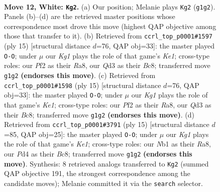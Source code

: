 \documentclass[11pt]{article}
\begin{document}
\clearpage

\begin{figure}[p]\centering
\begin{subfigure}{0.46\textwidth}\centering
\resizebox{\linewidth}{!}{%
\newchessgame
\chessboard[
  setfen={rnbqr1k1/p3bppp/2p1p3/1p1n4/3P4/3Q1BP1/PP1NPP1P/RNB2RK1 w - - 0 12},
  showmover=false,
  pgfstyle=straightmove, color=movearrow, markmove={g1-g2}
]}
\caption{}
\end{subfigure}\hfill
\begin{subfigure}{0.46\textwidth}\centering
\resizebox{\linewidth}{!}{%
\newchessgame
\chessboard[
  setfen={r1bqk2r/ppp1npbp/2np2p1/8/2PNP3/2N1B1P1/PP3P1P/R2QKB1R b KQkq - 2 8},
  showmover=false,
  pgfstyle=straightmove, color=movearrow, markmove={e8-g8}
]}
\caption{}
\end{subfigure}
\\[4pt]
\begin{subfigure}{0.46\textwidth}\centering
\resizebox{\linewidth}{!}{%
\newchessgame
\chessboard[
  setfen={r1bqk2r/ppp1npbp/2np2p1/8/2PNP3/2N1B1P1/PP3P1P/R2QKB1R b KQkq - 2 8},
  showmover=false,
  pgfstyle=straightmove, color=movearrow, markmove={e8-g8}
]}
\caption{}
\end{subfigure}\hfill
\begin{subfigure}{0.46\textwidth}\centering
\resizebox{\linewidth}{!}{%
\newchessgame
\chessboard[
  setfen={r1bqk2r/1pppnpbp/p1n3p1/8/B2PP3/5N1P/PP3PP1/RNBQK2R b KQkq - 0 8},
  showmover=false,
  pgfstyle=straightmove, color=movearrow, markmove={e8-g8}
]}
\caption{}
\end{subfigure}
\caption{\textbf{Move 12, White: \texttt{Kg2}.} (a) Our position; Melanie plays \texttt{Kg2} (\texttt{g1g2}). Panels (b)--(d) are the retrieved master positions whose correspondence most drove this move (highest QAP objective among those that transfer to it). (b) Retrieved from \texttt{ccrl\_top\_p0001\#1597} (ply 15) [structural distance $d$=76, QAP obj=33]: the master played \texttt{O-O}; under $\mu$ our \emph{Kg1} plays the role of that game's \emph{Ke1}; cross-type roles: our \emph{P}f2 as their \emph{R}a8, our \emph{Q}d3 as their \emph{B}c8; transferred move \texttt{g1g2} \textbf{(endorses this move)}. (c) Retrieved from \texttt{ccrl\_top\_p0001\#1598} (ply 15) [structural distance $d$=76, QAP obj=33]: the master played \texttt{O-O}; under $\mu$ our \emph{Kg1} plays the role of that game's \emph{Ke1}; cross-type roles: our \emph{P}f2 as their \emph{R}a8, our \emph{Q}d3 as their \emph{B}c8; transferred move \texttt{g1g2} \textbf{(endorses this move)}. (d) Retrieved from \texttt{ccrl\_top\_p0001\#3791} (ply 15) [structural distance $d$=85, QAP obj=25]: the master played \texttt{O-O}; under $\mu$ our \emph{Kg1} plays the role of that game's \emph{Ke1}; cross-type roles: our \emph{N}b1 as their \emph{R}a8, our \emph{P}d4 as their \emph{B}c8; transferred move \texttt{g1g2} \textbf{(endorses this move)}. Synthesis: 8 retrieved analogs transferred to \texttt{Kg2} (summed QAP objective 191, the strongest correspondence among the candidate moves); Melanie committed it via the \texttt{search} selector.}
\label{fig:thought-m22}
\end{figure}
\end{document}
